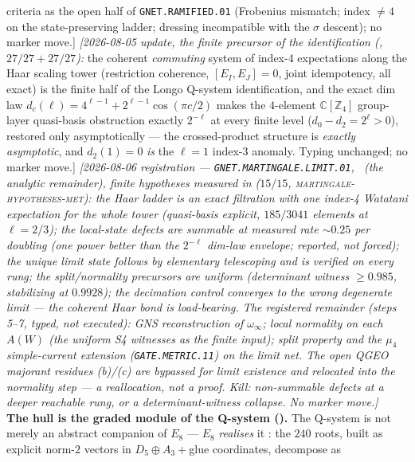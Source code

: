 \documentclass[11pt,a4paper]{article}
\newcommand{\Z}{\mathbb Z}
\begin{document}
criteria as the open half of \texttt{GNET.RAMIFIED.01} (Frobenius
mismatch; index $\ne4$ on the state-preserving ladder; dressing
incompatible with the $\sigma$ descent); no marker move.]
\emph{[2026-08-05 update, the finite precursor of the
identification (, $27/27+27/27$):}
the coherent \emph{commuting} system of index-4 expectations along
the Haar scaling tower (restriction coherence, $[E_I,E_J]=0$,
joint idempotency, all exact) is the finite half of the Longo
Q-system identification, and the exact dim law
$d_c(\ell)=4^{\ell-1}+2^{\ell-1}\cos(\pi c/2)$ makes the
$4$-element $\mathbb C[\Z_4]$ group-layer quasi-basis obstruction
exactly $2^{-\ell}$ at every finite level ($d_0-d_2=2^\ell>0$),
restored only asymptotically --- the crossed-product structure is
\emph{exactly asymptotic}, and $d_2(1)=0$ \emph{is} the $\ell=1$
index-3 anomaly.  Typing unchanged; no marker move.]
\emph{[2026-08-06 registration ---
\texttt{GNET.MARTINGALE.LIMIT.01}, \mO\ (the analytic remainder),
finite hypotheses measured in 
($15/15$, \textsc{martingale-hypotheses-met}): the Haar ladder is
an exact filtration with \emph{one} index-4 Watatani expectation
for the whole tower (quasi-basis explicit, $185/3041$ elements at
$\ell=2/3$); the local-state defects are summable at measured rate
${\sim}0.25$ per doubling (one power better than the $2^{-\ell}$
dim-law envelope; reported, not forced); the unique limit state
follows by elementary telescoping and is verified on every rung;
the split/normality precursors are uniform (determinant witness
$\ge0.985$, stabilizing at $0.9928$); the decimation control
converges to the \emph{wrong} degenerate limit --- the coherent
Haar bond is load-bearing.  \emph{The registered remainder (steps
5--7, typed, not executed):} GNS reconstruction of
$\omega_\infty$; local normality on each $A(W)$ (the uniform S4
witnesses as the finite input); split property and the $\mu_4$
simple-current extension (\texttt{GATE.METRIC.11}) on the limit
net.  The open QGEO majorant residues (b)/(c) are bypassed for
limit existence and relocated into the normality step --- a
reallocation, not a proof.  Kill: non-summable defects at a deeper
reachable rung, or a determinant-witness collapse.  No marker
move.]}
\smallskip\\
\noindent\textbf{The hull is the graded module of the Q-system ().} The
Q-system is not merely an abstract companion of $E_8$ --- $E_8$ \emph{realises} it \mE: the $240$
roots, built as explicit norm-$2$ vectors in $D_5\oplus A_3+$glue coordinates, decompose as
\end{document}
